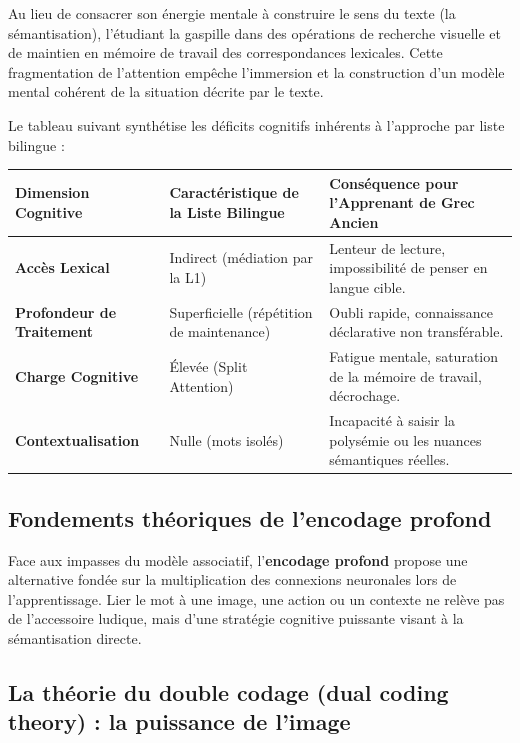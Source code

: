 Au lieu de consacrer son énergie mentale à construire le sens du texte (la sémantisation),
l'étudiant la gaspille dans des opérations de recherche visuelle et de maintien en mémoire de
travail des correspondances lexicales. Cette fragmentation de l'attention empêche l'immersion et la
construction d'un modèle mental cohérent de la situation décrite par le texte.

Le tableau suivant synthétise les déficits cognitifs inhérents à l'approche par liste bilingue :

\begin{table}[h!]\small\centering\begin{tabular}{| p{2.3cm} | p{3.5cm} | p{3.5cm} |}\hline\textbf{Dimension Cognitive} & \textbf{Caractéristique de la Liste Bilingue} & \textbf{Conséquence pour l'Apprenant de Grec Ancien} \\ \hline\textbf{Accès Lexical} & Indirect (médiation par la L1) & Lenteur de lecture, impossibilité de penser en langue cible. \\ \hline\textbf{Profondeur de Traitement} & Superficielle (répétition de maintenance) & Oubli rapide, connaissance déclarative non transférable. \\ \hline\textbf{Charge Cognitive} & Élevée (Split Attention) & Fatigue mentale, saturation de la mémoire de travail, décrochage. \\ \hline\textbf{Contextualisation} & Nulle (mots isolés) & Incapacité à saisir la polysémie ou les nuances sémantiques réelles. \\ \hline\end{tabular}\end{table}

\subsection{Fondements théoriques de l'encodage profond}

Face aux impasses du modèle associatif, l'\textbf{encodage profond} propose une alternative fondée
sur la multiplication des connexions neuronales lors de l'apprentissage. Lier le mot à une image,
une action ou un contexte ne relève pas de l'accessoire ludique, mais d'une stratégie cognitive
puissante visant à la \og sémantisation directe\fg{}.



\subsection{La théorie du double codage (dual coding theory) : la puissance de l'image}

